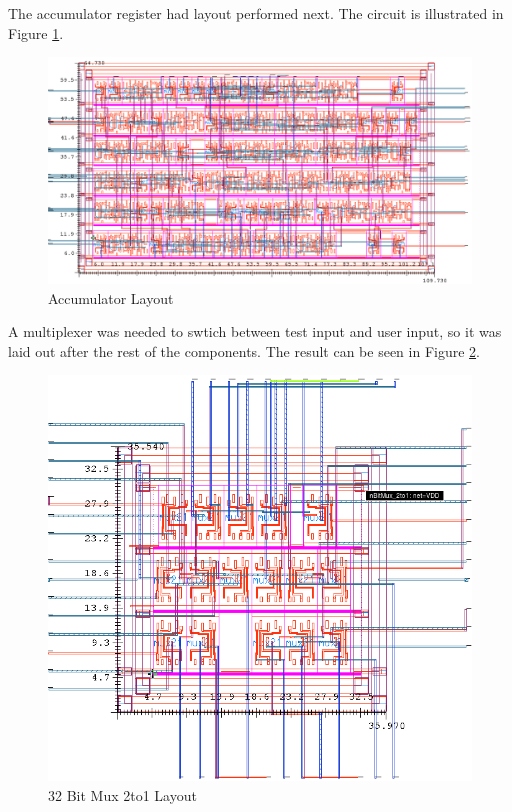 \documentclass[11pt]{article}
\begin{document}
		The accumulator register had layout performed next. The circuit is illustrated in Figure \ref{fig:nBitRegister-32-Bit-Layout}. 
	
		\begin{figure}[H] 
			\centering 
			\includegraphics[width=\textwidth,height=\dimexpr\textheight-4\baselineskip-\abovecaptionskip-\belowcaptionskip\relax,keepaspectratio]{"Pictures/nBitRegister 32-Bit Layout"}
			\caption{Accumulator Layout} 
			\label{fig:nBitRegister-32-Bit-Layout} 
		\end{figure}
	
		A multiplexer was needed to swtich between test input and user input, so it was laid out after the rest of the components. The result can be seen in Figure \ref{fig:nBitMux-2to1-Layout}.

		\begin{figure}[H] 
			\centering 
			\includegraphics[width=\textwidth,height=\dimexpr\textheight-4\baselineskip-\abovecaptionskip-\belowcaptionskip\relax,keepaspectratio]{"Pictures/nBitMux_2to1 Layout"}
			\caption{32 Bit Mux 2to1 Layout} 
			\label{fig:nBitMux-2to1-Layout} 
		\end{figure}
	
\end{document}
